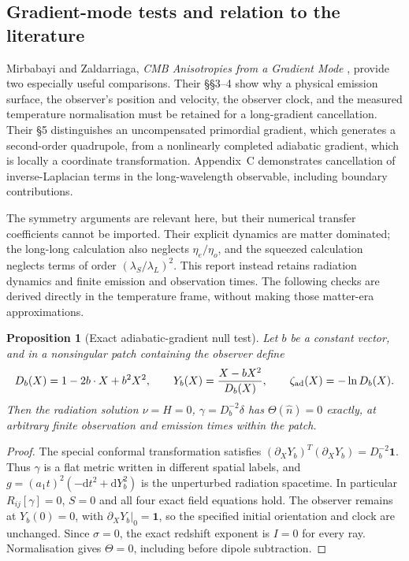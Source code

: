 \documentclass[11pt]{article}
\newtheorem{proposition}[theorem]{Proposition}
\theoremstyle{definition}
\theoremstyle{remark}
\newcommand{\nh}{\hat n}
\newcommand{\dd}{\mathrm{d}}
\begin{document}
\subsection{Gradient-mode tests and relation to the literature}\label{sec:gradient-checks}
Mirbabayi and Zaldarriaga, \emph{CMB Anisotropies from a Gradient Mode}
\cite{MirbabayiZaldarriaga}, provide two especially useful comparisons. Their
\S\S3--4 show why a physical emission surface, the observer's position and velocity, the
observer clock, and the measured temperature normalisation must be retained for a
long-gradient cancellation. Their \S5 distinguishes an uncompensated primordial gradient,
which generates a second-order quadrupole, from a nonlinearly completed adiabatic gradient,
which is locally a coordinate transformation. Appendix~C demonstrates cancellation of
inverse-Laplacian terms in the long-wavelength observable, including boundary contributions.

The symmetry arguments are relevant here, but their numerical transfer coefficients cannot
be imported. Their explicit dynamics are matter dominated; the long-long calculation also
neglects $\eta_e/\eta_o$, and the squeezed calculation neglects terms of order
$(\lambda_S/\lambda_L)^2$. This report instead retains radiation dynamics and finite
emission and observation times. The following checks are derived directly in the temperature
frame, without making those matter-era approximations.

\begin{proposition}[Exact adiabatic-gradient null test]\label{prop:gradient-null}
Let $b$ be a constant vector, and in a nonsingular patch containing the observer define
\begin{equation}\label{eq:finite-conformal-map}
D_b(X)=1-2b\cdot X+b^2X^2,\qquad
Y_b(X)=\frac{X-bX^2}{D_b(X)},\qquad
\zeta_{\rm ad}(X)=-\ln D_b(X).
\end{equation}
Then the radiation solution $\nu=H=0$, $\gamma=D_b^{-2}\delta$ has
$\Theta(\nh)=0$ exactly, at arbitrary finite observation and emission times within the patch.
\end{proposition}
\begin{proof}
The special conformal transformation satisfies
$(\partial_XY_b)^T(\partial_XY_b)=D_b^{-2}\mathbf1$. Thus $\gamma$ is a flat metric written
in different spatial labels, and $g=(a_1t)^2(-\dd t^2+\dd Y_b^2)$ is the unperturbed
radiation spacetime. In particular $R_{ij}[\gamma]=0$, $S=0$ and all four exact field
equations hold. The observer remains at $Y_b(0)=0$, with
$\partial_XY_b|_0=\mathbf1$, so the specified initial orientation and clock are unchanged.
Since $\sigma=0$, the exact redshift exponent is $I=0$ for every ray. Normalisation gives
$\Theta=0$, including before dipole subtraction.
\end{proof}
\end{document}
